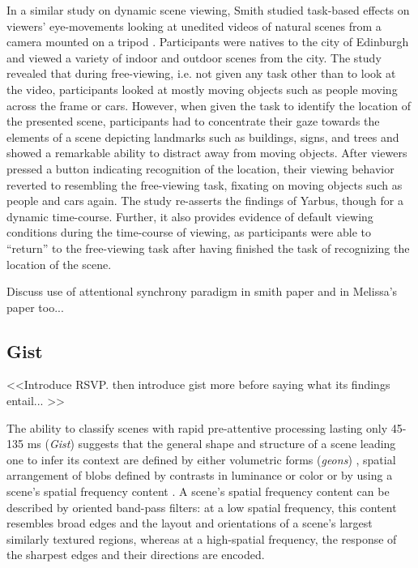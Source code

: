 \documentclass[a4paper,10pt,final]{ThesisStyle}
\begin{document}
In a similar study on dynamic scene viewing, Smith studied task-based effects on viewers' eye-movements looking at unedited videos of natural scenes from a camera mounted on a tripod \cite{Smith2011a}.  Participants were natives to the city of Edinburgh and viewed a variety of indoor and outdoor scenes from the city.  The study revealed that during free-viewing, i.e. not given any task other than to look at the video, participants looked at mostly moving objects such as people moving across the frame or cars.  However, when given the task to identify the location of the presented scene, participants had to concentrate their gaze towards the elements of a scene depicting landmarks such as buildings, signs, and trees and showed a remarkable ability to distract away from moving objects.  After viewers pressed a button indicating recognition of the location, their viewing behavior reverted to resembling the free-viewing task, fixating on moving objects such as people and cars again.  The study re-asserts the findings of Yarbus, though for a dynamic time-course.  Further, it also provides evidence of default viewing conditions during the time-course of viewing, as participants were able to ``return'' to the free-viewing task after having finished the task of recognizing the location of the scene.  

Discuss use of attentional synchrony paradigm in smith paper and in Melissa's paper too...

\subsection{Gist}
\label{sec:gist}

<<Introduce RSVP. then introduce gist more before saying what its findings entail... >>

The ability to classify scenes with rapid pre-attentive processing lasting only 45-135 ms (\textit{Gist}) \cite{Potter1969,Biederman1974,Potter1976,Schyns1994,Henderson1999} suggests that the general shape and structure of a scene leading one to infer its context are defined by either volumetric forms (\textit{geons}) \cite{Biederman1987}, spatial arrangement of blobs defined by contrasts in luminance or color \cite{Schyns1994,Oliva1997} or by using a scene's spatial frequency content \cite{Oliva2001,Oliva2005}.  A scene's spatial frequency content can be described by oriented band-pass filters: at a low spatial frequency, this content resembles broad edges and the layout and orientations of a scene's largest similarly textured regions, whereas at a high-spatial frequency, the response of the sharpest edges and their directions are encoded.  
\end{document}
